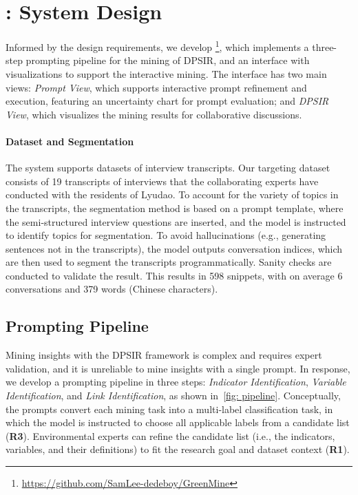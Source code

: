 
\section{\system: System Design}
Informed by the design requirements, we develop \system\footnote{\url{https://github.com/SamLee-dedeboy/GreenMine}}, which implements a three-step prompting pipeline for the mining of DPSIR, and an interface with visualizations to support the interactive mining. The interface has two main views: \textit{Prompt View}, which supports interactive prompt refinement and execution, featuring an uncertainty chart for prompt evaluation; and \textit{DPSIR View}, which visualizes the mining results for collaborative discussions. 

\paragraph{Dataset and Segmentation}
The system supports datasets of interview transcripts.
Our targeting dataset consists of 19 transcripts of interviews that the collaborating experts have conducted with the residents of Lyudao. 
To account for the variety of topics in the transcripts, the segmentation method is based on a prompt template, where the semi-structured interview questions are inserted, and the model is instructed to identify topics for segmentation. To avoid hallucinations (e.g., generating sentences not in the transcripts), the model outputs conversation indices, which are then used to segment the transcripts programmatically. Sanity checks are conducted to validate the result. This results in 598 snippets, with on average 6 conversations and 379 words (Chinese characters). 

\subsection{Prompting Pipeline}
Mining insights with the DPSIR framework is complex and requires expert validation, and it is unreliable to mine insights with a single prompt.
In response, we develop a prompting pipeline in three steps: \textit{Indicator Identification}, \textit{Variable Identification}, and \textit{Link Identification}, as shown in~\autoref{fig: pipeline}.
Conceptually, the prompts convert each mining task into a multi-label classification task, in which the model is instructed to choose all applicable labels from a candidate list (\textbf{R3}). 
Environmental experts can refine the candidate list (i.e., the indicators, variables, and their definitions) to fit the research goal and dataset context (\textbf{R1}). 

